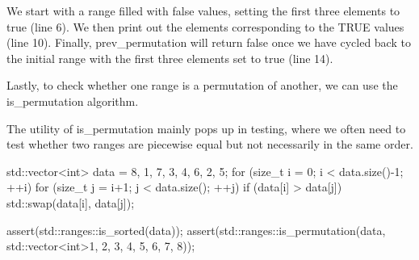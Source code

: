 We start with a range filled with false values, setting the first three elements to true (line 6). We then print out the elements corresponding to the TRUE values (line 10). Finally, prev\_permutation will return false once we have cycled back to the initial range with the first three elements set to true (line 14).

Lastly, to check whether one range is a permutation of another, we can use the is\_permutation algorithm.



The utility of is\_permutation mainly pops up in testing, where we often need to test whether two ranges are piecewise equal but not necessarily in the same order.

\begin{box-note}
\begin{cppcode}
std::vector<int> data = { 8, 1, 7, 3, 4, 6, 2, 5};
for (size_t i = 0; i < data.size()-1; ++i)
    for (size_t j = i+1; j < data.size(); ++j)
        if (data[i] > data[j])
            std::swap(data[i], data[j]);

assert(std::ranges::is_sorted(data));
assert(std::ranges::is_permutation(data, 
                                   std::vector<int>{1, 2, 3, 4, 5, 6, 7, 8}));
\end{cppcode}
\end{box-note}